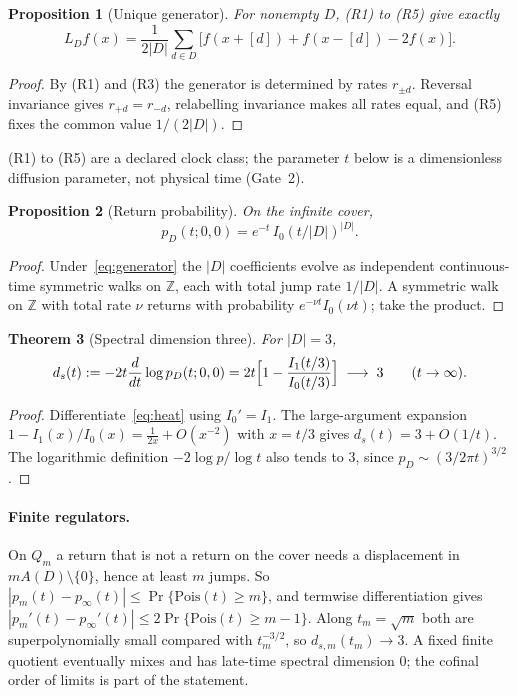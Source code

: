 \documentclass[11pt]{article}
\newtheorem{theorem}{Theorem}[section]
\newtheorem{proposition}[theorem]{Proposition}
\theoremstyle{definition}
\theoremstyle{remark}
\newcommand{\Z}{\mathbb{Z}}
\begin{document}
\begin{proposition}[Unique generator]
For nonempty $D$, (R1) to (R5) give exactly
\begin{equation}
L_Df(x)=\frac{1}{2|D|}\sum_{d\in D}\bigl[f(x+[d])+f(x-[d])-2f(x)\bigr].
\label{eq:generator}
\end{equation}
\end{proposition}

\begin{proof}
By (R1) and (R3) the generator is determined by rates $r_{\pm d}$. Reversal invariance
gives $r_{+d}=r_{-d}$, relabelling invariance makes all rates equal, and (R5) fixes the
common value $1/(2|D|)$.
\end{proof}

(R1) to (R5) are a declared clock class; the parameter $t$ below is a dimensionless
diffusion parameter, not physical time (Gate~2).

\begin{proposition}[Return probability]
On the infinite cover,
\begin{equation}
p_D(t;0,0)=e^{-t}\,I_0\!\left(t/|D|\right)^{|D|}.
\label{eq:heat}
\end{equation}
\end{proposition}

\begin{proof}
Under~\eqref{eq:generator} the $|D|$ coefficients evolve as independent continuous-time
symmetric walks on $\Z$, each with total jump rate $1/|D|$. A symmetric walk on $\Z$ with
total rate $\nu$ returns with probability $e^{-\nu t}I_0(\nu t)$; take the product.
\end{proof}

\begin{theorem}[Spectral dimension three]
\label{thm:ds}
For $|D|=3$,
\begin{equation}
d_s(t):=-2t\frac{d}{dt}\log p_D(t;0,0)=2t\Bigl[1-\frac{I_1(t/3)}{I_0(t/3)}\Bigr]
\;\longrightarrow\;3\qquad(t\to\infty).
\label{eq:ds}
\end{equation}
\end{theorem}

\begin{proof}
Differentiate~\eqref{eq:heat} using $I_0'=I_1$. The large-argument expansion
$1-I_1(x)/I_0(x)=\frac{1}{2x}+O(x^{-2})$ with $x=t/3$ gives $d_s(t)=3+O(1/t)$. The
logarithmic definition $-2\log p/\log t$ also tends to $3$, since
$p_D\sim(3/2\pi t)^{3/2}$.
\end{proof}

\paragraph{Finite regulators.} On $Q_m$ a return that is not a return on the cover needs
a displacement in $mA(D)\setminus\{0\}$, hence at least $m$ jumps. So
$|p_m(t)-p_\infty(t)|\le\Pr\{\mathrm{Pois}(t)\ge m\}$, and termwise differentiation gives
$|p_m'(t)-p_\infty'(t)|\le2\Pr\{\mathrm{Pois}(t)\ge m-1\}$. Along $t_m=\sqrt m$ both are
superpolynomially small compared with $t_m^{-3/2}$, so $d_{s,m}(t_m)\to3$. A fixed finite
quotient eventually mixes and has late-time spectral dimension $0$; the cofinal order of
limits is part of the statement.
\end{document}
